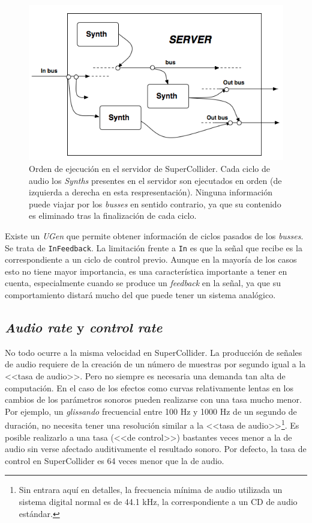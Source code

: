 \begin{figure}
	\centering
	\includegraphics[width=1\textwidth]{images/sc_server}
	\caption[Orden de ejecución en el servidor de SuperCollider]{Orden de ejecución en el servidor de SuperCollider. Cada ciclo de audio los \textit{Synths} presentes en el servidor son ejecutados en orden (de izquierda a derecha en esta respresentación). Ninguna información puede viajar por los \textit{busses} en sentido contrario, ya que su contenido es eliminado tras la finalización de cada ciclo.}
	\label{fig:sc_server}
\end{figure}

Existe un \textit{UGen} que permite obtener información de ciclos pasados de los \textit{busses}. Se trata de \texttt{InFeedback}. La limitación frente a \texttt{In} es que la señal que recibe es la correspondiente a un ciclo de control previo. Aunque en la mayoría de los casos esto no tiene mayor importancia, es una característica importante a tener en cuenta, especialmente cuando se produce un \textit{feedback} en la señal, ya que su comportamiento distará mucho del que puede tener un sistema analógico. 

\subsection{\textit{Audio rate} y \textit{control rate}}
No todo ocurre a la misma velocidad en SuperCollider. La producción de señales de audio requiere de la creación de un número de muestras por segundo igual a la <<tasa de audio>>. Pero no siempre es necesaria una demanda tan alta de computación. En el caso de los efectos como curvas relativamente lentas en los cambios de los parámetros sonoros pueden realizarse con una tasa mucho menor. Por ejemplo, un \textit{glissando} frecuencial entre 100 Hz y 1000 Hz de un segundo de duración, no necesita tener una resolución similar a la <<tasa de audio>>\footnote{Sin entrara aquí en detalles, la frecuencia mínima de audio utilizada un sistema digital normal es de 44.1 kHz, la correspondiente a un CD de audio estándar.}. Es posible realizarlo a una tasa (<<de control>>) bastantes veces menor a la de audio sin verse afectado auditivamente el resultado sonoro. Por defecto, la tasa de control en SuperCollider es 64 veces menor que la de audio.

